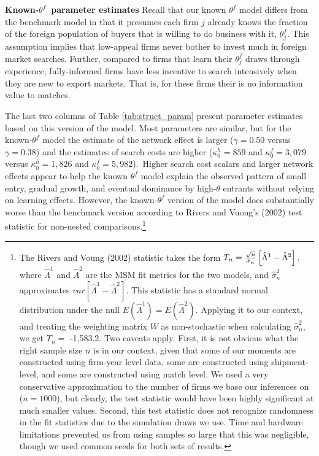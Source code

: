 \documentclass[12pt]{article}
\begin{document}
\textbf{Known-}$\theta ^{f}$\textbf{\ parameter estimates }Recall that our
known $\theta ^{f}$ model differs from the benchmark model in that it
presumes each firm $j$ already knows the fraction of the foreign population
of buyers that is willing to do business with it, $\theta _{j}^{f}.$ This
assumption implies that low-appeal firms never bother to invest much in
foreign market searches. Further, compared to firms that learn their $\theta
_{j}^{f}$ draws through experience, fully-informed firms have less incentive
to search intensively when they are new to export markets. That is, for
these firms their is no information value to matches.

The last two columns of Table \ref{tab:struct_param} present parameter
estimates based on this version of the model. Most parameters are similar,
but for the known-$\theta ^{f}$ model the estimate of the network effect is
larger ($\gamma =0.50$ versus $\gamma =0.38$) and the estimates of search
costs are higher ($\kappa _{0}^{h}=859$ and $\kappa _{0}^{f}=3,079$ versus $%
\kappa _{0}^{h}=1,826$ and $\kappa _{0}^{f}=5,982$).\ Higher search cost
scalars and larger network effects appear to help the known $\theta ^{f}$
model explain the observed pattern of small entry, gradual growth, and
eventual dominance by high-$\theta $ entrants without relying on learning
effects. However, the known-$\theta ^{f}$ version of the model does
substantially worse than the benchmark version according to Rivers and
Vuong's (2002) test statistic for non-nested comparisons.\footnote{%
The Rivers and Voung (2002) statistic takes the form $T_{n}=\frac{\sqrt{n}}{%
\hat{\sigma}_{n}}\left[ \hat{\Lambda}^{1}-\hat{\Lambda}^{2}\right] ,$ where $%
\hat{\Lambda}^{1}$ and $\hat{\Lambda}^{2}$ are the MSM fit metrics for the
two models, and $\hat{\sigma}_{n}^{2}$ approximates $var\left[ \hat{\Lambda}%
^{1}-\hat{\Lambda}^{2}\right] .$ This statistic has a standard normal
distribution under the null $E(\hat{\Lambda}^{1})=E(\hat{\Lambda}^{2}).$
Applying it to our context, and treating the weighting matrix $W$ as
non-stochastic when calculating $\hat{\sigma}_{n}^{2}$, we get $T_{n}=$
-1,583.2. Two caveats apply. First, it is not obvious what the right sample
size $n$ is in our context, given that some of our moments are constructed
using firm-year level data, some are constructed using shipment-level, and
some are constructed using match level. We used a very conservative
approximation to the number of firms we base our inferences on ($n=1000$),
but clearly, the test statistic would have been highly significant at much
smaller values. Second, this test statistic does not recognize randomness in
the fit statistics due to the simulation draws we use. Time and hardware
limitations prevented us from using samples so large that this was
negligible, though we used common seeds for both sets of results.}
\end{document}
